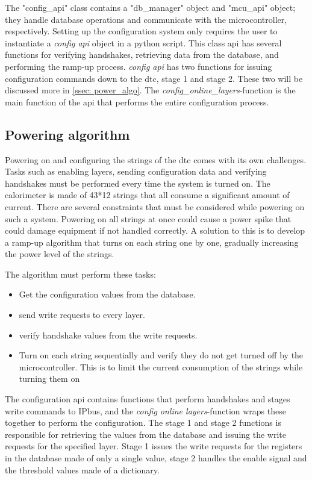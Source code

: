 \documentclass[main.tex]{subfiles}
\begin{document}
The "config\_api" class contains a "db\_manager" object and "mcu\_api" object; they handle database operations and communicate with the microcontroller, respectively. Setting up the configuration system only requires the user to instantiate a \textit{config api} object in a python script. This class \gls{api} has several functions for verifying handshakes, retrieving data from the database, and performing the ramp-up process. \textit{config api} has two functions for issuing configuration commands down to the \gls{dtc}, stage 1 and stage 2. These two will be discussed more in \autoref{ssec: power_algo}. The \textit{config\_online\_layers}-function is the main function of the \gls{api} that performs the entire configuration process.



\subsection{Powering algorithm}
\label{ssec: power_algo}
Powering on and configuring the strings of the \gls{dtc} comes with its own challenges. Tasks such as enabling layers, sending configuration data and verifying handshakes must be performed every time the system is turned on. The calorimeter is made of 43*12 strings that all consume a significant amount of current. There are several constraints that must be considered while powering on such a system. Powering on all strings at once could cause a power spike that could damage equipment if not handled correctly. A solution to this is to develop a ramp-up algorithm that turns on each string one by one, gradually increasing the power level of the strings. 

The algorithm must perform these tasks:

\begin{itemize}
    \item Get the configuration values from the database.
    \item send write requests to every layer.
    \item verify handshake values from the write requests.
    \item Turn on each string sequentially and verify they do not get turned off by the microcontroller. This is to limit the current consumption of the strings while turning them on
\end{itemize}

The configuration \gls{api} contains functions that perform handshakes and stages write commands to IPbus, and the \textit{config online layers}-function wraps these together to perform the configuration. The stage 1 and stage 2 functions is responsible for retrieving the values from the database and issuing the write requests for the specified layer. Stage 1 issues the write requests for the registers in the database made of only a single value, stage 2 handles the enable signal and the threshold values made of a dictionary.
\end{document}
